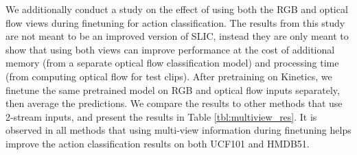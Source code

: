 \documentclass[10pt,twocolumn,letterpaper]{article}
\begin{document}
We additionally conduct a study on the effect of using both the RGB and optical flow views during finetuning for action classification. The results from this study are not meant to be an improved version of SLIC, instead they are only meant to show that using both views can improve performance at the cost of additional memory (from a separate optical flow classification model) and processing time (from computing optical flow for test clips). After pretraining on Kinetics,
we finetune the same pretrained model on RGB and optical flow inputs separately, 
then average the predictions. We compare the results to other methods that use 2-stream inputs, and present the results in Table \ref{tbl:multiview_res}. It is observed in all methods that using multi-view information during finetuning helps improve the action classification results on both UCF101 and HMDB51. 



\begin{table}[h!]
\caption{\textbf{End-to-end finetuning top-1 accuracy results for action classification} pretrained on Kinetics400, then fine-tuned on UCF101 and HMDB51, using only visual inputs.
  \color{gray}
  {Methods with \textsuperscript{\textdagger} use optical flow in addition to RGB as inputs to the action classification model.}
  }
  \label{tbl:multiview_res}
    \vspace{-0.1cm}

  \centering
  
  \vspace{-0.20cm}
\end{table}
\end{document}

